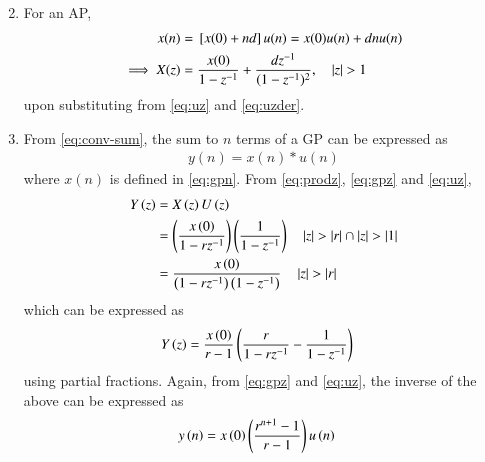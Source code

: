 \documentclass[journal,12pt,onecolumn]{IEEEtran}
\theoremstyle{remark}
\begin{document}
\begin{enumerate}[label=\thechapter.\arabic*,ref=\thechapter.\theenumi]
\begin{align}
	       \label{eq:uzder}
\end{align}
\item For an AP, 
\begin{align}
	x(n) &= {}\left[x(0) + nd\right] u(n) = x(0)u(n) + dnu(n)  \\
	\implies X(z) &= \frac{x(0)}{1-z^{-1}} + \frac{dz^{-1}}{(1-z^{-1})^{2}}, \quad \left\vert z\right\vert > 1 
	       \label{eq:apz}
\end{align}
upon substituting from 
	       \eqref{eq:uz}
	       and
	       \eqref{eq:uzder}.
\item From 
	\eqref{eq:conv-sum},  the sum to $n$ terms  of a GP can be expressed as
\begin{align}
	y(n) = x(n)*u(n) 
\end{align}
		where $x(n)$ is defined in 
	       \eqref{eq:gpn}.
From \eqref{eq:prodz}, \eqref{eq:gpz} and \eqref{eq:uz},
\begin{align}
	Y\left(z\right)&= X\left(z\right) U\left(z\right)
	\\
	&=\left(\frac{x\left(0\right)}{1-rz^{-1}}\right)\left(\frac{1}{1-z^{-1}}\right) \quad \left\vert z\right\vert > \left\vert r\right\vert \cap \left\vert z\right\vert>\left\vert1\right\vert
	\\
	&=\frac{x\left(0\right)}{\left(1-rz^{-1}\right)\left(1-z^{-1}\right)} \quad \left\vert z\right\vert > \left\vert r\right\vert 
\end{align}
which can be expressed as
\begin{align}
	Y\left(z\right)&=\frac{x\left(0\right)}{r-1}\left(\frac{r}{1-rz^{-1}} - \frac{1}{1-z^{-1}}\right)
\end{align}
using partial fractions.  Again, from \eqref{eq:gpz} and \eqref{eq:uz}, the inverse of the above can be expressed as
\begin{align}
	y\left(n\right)
	&=x\left(0\right)\left(\frac{r^{n+1}-1}{r-1}\right)u\left(n\right)
\end{align}


\end{enumerate}
\end{document}
